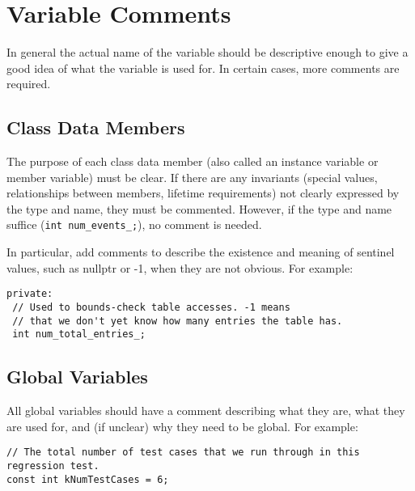 
\section{Variable Comments}\label{sec:variable-comments}
In general the actual name of the variable should be descriptive enough to give a good idea of what the variable is used for. In certain cases, more comments are required.

    \subsection{Class Data Members}
    The purpose of each class data member (also called an instance variable or member variable) must be clear. If there are any invariants (special values, relationships between members, lifetime requirements) not clearly expressed by the type and name, they must be commented. However, if the type and name suffice (\texttt{int num_events_;}), no comment is needed.

    In particular, add comments to describe the existence and meaning of sentinel values, such as nullptr or -1, when they are not obvious. For example:
\begin{verbatim}
private:
 // Used to bounds-check table accesses. -1 means
 // that we don't yet know how many entries the table has.
 int num_total_entries_;
    \end{verbatim}

    \subsection{Global Variables}
    All global variables should have a comment describing what they are, what they are used for, and (if unclear) why they need to be global. For example:
\begin{verbatim}
// The total number of test cases that we run through in this regression test.
const int kNumTestCases = 6;
    \end{verbatim}
